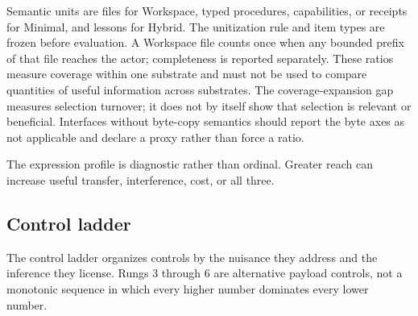 \documentclass[10pt,twocolumn]{article}
\begin{document}
Semantic units are files for Workspace, typed procedures, capabilities,
or receipts for Minimal, and lessons for Hybrid. The unitization rule
and item types are frozen before evaluation. A Workspace file counts
once when any bounded prefix of that file reaches the actor;
completeness is reported separately. These ratios measure coverage
within one substrate and must not be used to compare quantities of
useful information across substrates. The coverage-expansion gap
measures selection turnover; it does not by itself show that selection
is relevant or beneficial. Interfaces without byte-copy semantics should
report the byte axes as not applicable and declare a proxy rather than
force a ratio.

The expression profile is diagnostic rather than ordinal. Greater reach
can increase useful transfer, interference, cost, or all three.

\subsection{Control ladder}\label{control-ladder}

The control ladder organizes controls by the nuisance they address and
the inference they license. Rungs 3 through 6 are alternative payload
controls, not a monotonic sequence in which every higher number
dominates every lower number.
\end{document}
